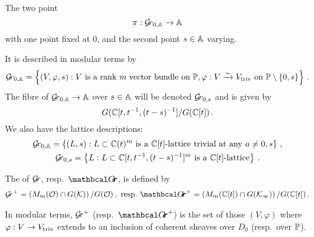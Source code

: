 \documentclass[draft]{article} %
\begin{document}
% 
\begin{definition} 
\label{def:bdgr}
The two point  $$\pi : \Grbd\to \AA$$ with one point fixed at 0, and the second point $s\in\AA$ varying.
\end{definition}
% 
It is described in modular terms by 
$$
\Grbd = 
    \left\{ 
        (V,\varphi,s) : V\text{ is a rank $m$ vector bundle on }\PP, \varphi : V \xrightarrow{\sim} \Vtriv \text{ on } \PP \setminus \{0, s\}  
    \right\}\,. 
$$
% 
The fibre of $\Grbd \to \AA$ over $ s \in \AA $ will be denoted $ \Gr_{0,s} $ and is given by
% 
$$ 
    G(\CC[t, t^{-1}, (t-s)^{-1}]/G(\CC[t])\,. %
$$
% 
We also have the lattice descriptions:
% 
\begin{gather*}
\Grbd = 
    \left\{ 
        (L,s) : L \subset  \CC(t)^m\text{ is a $\CC[t]$-lattice trivial at any }a \ne 0, s 
    \right\}\,, \\
\Gr_{0,s} = 
    \left\{ 
        L : L \subset  \CC[t,t^{-1},(t-s)^{-1}]^m \text{ is a $\CC[t]$-lattice} 
    \right\}\,.
\end{gather*}
% 
\begin{definition} 
\label{def:grplus}
The  of $\Gr $, resp.\ $\Grth$, is defined by 
\begin{gather*}
    \Gr^+ = \left(M_m(\cO) \cap G(\cK)\right) / G(\cO)\,,\,\, %
    \text{resp.\ } {\Grth}^+ = \left(M_m(\CC[t]) \cap G(\Kinf)\right) / G(\CC[t])\,. 
\end{gather*}
\end{definition}
% 
In modular terms, $\Gr^+$ (resp.\ ${\Grth}^+$) is the set of those $ (V, \varphi)$ where $ \varphi : V \rightarrow \Vtriv $ extends to an inclusion of coherent sheaves over $ D_0 $ (resp.\ over $ \PP$).
\end{document}
